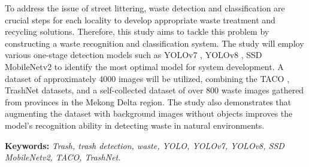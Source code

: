 \documentclass[./thesis.tex]{subfiles}
\begin{document}

{\fontsize{13}{12} \selectfont
To address the issue of street littering, waste detection and classification are crucial steps for each locality to develop appropriate waste treatment and recycling solutions.
Therefore, this study aims to tackle this problem by constructing a waste recognition and classification system. The study will employ various one-stage detection models such as YOLOv7 \cite{wang2022yolov7}, YOLOv8 \cite{YOLOv8}, SSD MobileNetv2 \cite{Liu_2016} \cite{sandler2019mobilenetv2} to identify the most optimal model for system development.
A dataset of approximately 4000 images will be utilized, combining the TACO \cite{proença2020taco}, TrashNet \cite{yang2016classification} datasets, and a self-collected dataset of over 800 waste images gathered from provinces in the Mekong Delta region.
The study also demonstrates that augmenting the dataset with background images without objects improves the model's recognition ability in detecting waste in natural environments.

}
\bigskip

{\bf Keywords:} \textit{Trash, trash detection, waste, YOLO, YOLOv7, YOLOv8, SSD MobileNetv2, TACO, TrashNet.}
\end{document}
